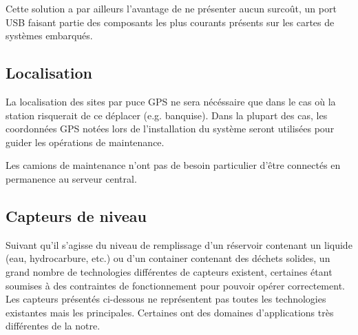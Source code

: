Cette solution a par ailleurs l'avantage de ne présenter aucun surcoût, un port USB faisant partie des composants les plus courants présents sur les cartes de systèmes embarqués.

\subsection{Localisation}

La localisation des sites par puce GPS ne sera nécéssaire que dans le cas où la station risquerait de ce déplacer (e.g. banquise). Dans la plupart des cas, les coordonnées GPS notées lors de l'installation du système seront utilisées pour guider les opérations de maintenance.

Les camions de maintenance n'ont pas de besoin particulier d'être connectés en permanence au serveur central.


	 	

 

\subsection{Capteurs de niveau}

Suivant qu'il s'agisse du niveau de remplissage d'un réservoir contenant un liquide (eau, hydrocarbure, etc.) ou d'un container contenant des déchets solides, un grand nombre de technologies différentes de capteurs existent, certaines étant soumises à des contraintes de fonctionnement pour pouvoir opérer correctement.
Les capteurs présentés ci-dessous ne représentent pas toutes les technologies existantes mais les principales. Certaines ont des domaines d'applications très différentes de la notre.

